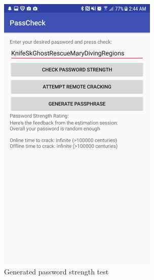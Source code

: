 \documentclass{article}
\begin{document}
\begin{figure}[ht]
      \includegraphics[width=3in]{img/t5s4.png}
      \centering
      \caption{Generated password strength test}
\end{figure}

\clearpage
\end{document}
